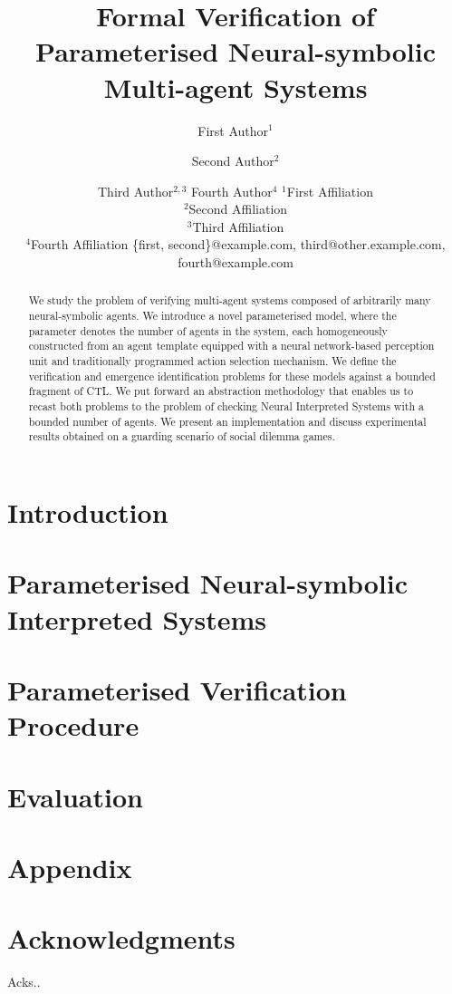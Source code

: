 \documentclass{article}
\title{Formal Verification of  Parameterised Neural-symbolic Multi-agent Systems}
\author{
}
\author{
First Author$^1$
\and
Second Author$^2$\and
Third Author$^{2,3}$\And
Fourth Author$^4$
\affiliations
$^1$First Affiliation\\
$^2$Second Affiliation\\
$^3$Third Affiliation\\
$^4$Fourth Affiliation
\emails
\{first, second\}@example.com,
third@other.example.com,
fourth@example.com
}
\begin{document}
\maketitle

\begin{abstract}

We study the problem of verifying multi-agent systems composed of arbitrarily
many neural-symbolic agents. We introduce a novel parameterised model, where the
parameter denotes the number of agents in the system, each homogeneously
constructed from an agent template equipped with a neural network-based
perception unit  and traditionally programmed action selection mechanism. We
define the verification and emergence identification problems for these models
against a bounded fragment of CTL. We put forward an abstraction methodology
that enables us to recast both problems to the problem of checking Neural
Interpreted Systems with a bounded number of agents. We present an
implementation and discuss experimental results obtained on a guarding scenario
of social dilemma games.



\end{abstract}

\section{Introduction}

\section{Parameterised Neural-symbolic Interpreted Systems}
\label{sec:pnis}

\section{Parameterised Verification Procedure}
\label{sec:verification}

\section{Evaluation}

\section*{Appendix}




\section*{Acknowledgments}
Acks..




\end{document}
